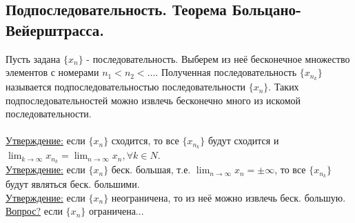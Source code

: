 \documentclass[12pt]{article}
\begin{document}
    \subsection{Подпоследовательность. Теорема Больцано-Вейерштрасса.}
    \noindent Пусть задана $\{x_n\}$ - последовательность. Выберем из неё бесконечное множество элементов с номерами $n_{1} < n_{2} < \dots$. Полученная последовательность $\{x_{n_{k}}\}$ называется подпоследовательностью последовательности $\{x_n\}$. Таких подпоследовательностей можно извлечь бесконечно много из искомой последовательности.\\\\
    \underline{Утверждение:} если $\{x_n\}$ сходится, то все $\{x_{n_{k}}\}$ будут сходится и $\lim_{k\to\infty} x_{n_{k}} = \lim_{n\to\infty} x_n, \forall k \in N$.\\
    \underline{Утверждение:} если $\{x_n\}$ беск. большая, т.е. $\lim_{n\to\infty}x_n = \pm \infty$, то все $\{x_{n_{k}}\}$ будут являться беск. большими.\\
    \underline{Утверждение:} если $\{x_n\}$ неограничена, то из неё можно извлечь беск. большую.\\
    \underline{Вопрос?} если $\{x_n\}$ ограничена...\\
    
\end{document}
